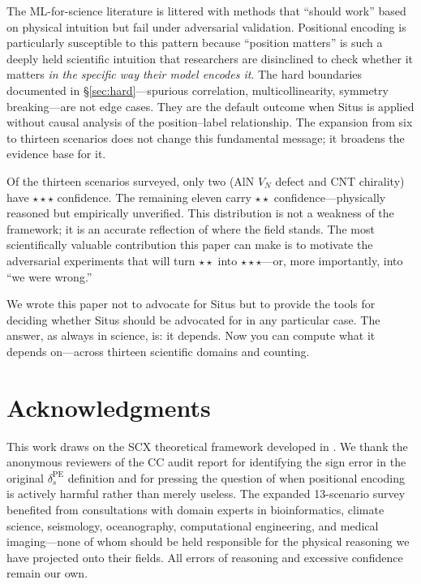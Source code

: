 \documentclass[12pt,a4paper]{article}
\begin{document}
The ML-for-science literature\cite{northcutt2021,ghorbani2019} is littered with methods that ``should work'' based on physical intuition but fail under adversarial validation. Positional encoding is particularly susceptible to this pattern because ``position matters'' is such a deeply held scientific intuition that researchers are disinclined to check whether it matters \emph{in the specific way their model encodes it}. The hard boundaries documented in \S\ref{sec:hard}---spurious correlation, multicollinearity, symmetry breaking---are not edge cases. They are the default outcome when Situs is applied without causal analysis of the position--label relationship. The expansion from six to thirteen scenarios does not change this fundamental message; it broadens the evidence base for it.

Of the thirteen scenarios surveyed, only two (AlN $V_N$ defect and CNT chirality) have $\star\star\star$ confidence. The remaining eleven carry $\star\star$ confidence—physically reasoned but empirically unverified. This distribution is not a weakness of the framework; it is an accurate reflection of where the field stands. The most scientifically valuable contribution this paper can make is to motivate the adversarial experiments that will turn $\star\star$ into $\star\star\star$---or, more importantly, into ``we were wrong.''

We wrote this paper not to advocate for Situs but to provide the tools for deciding whether Situs should be advocated for in any particular case. The answer, as always in science, is: it depends. Now you can compute what it depends on---across thirteen scientific domains and counting.

\section*{Acknowledgments}

This work draws on the SCX theoretical framework developed in \cite{cc_audit,ppe_derivation,situs_validation}. We thank the anonymous reviewers of the CC audit report for identifying the sign error in the original $\delta_s^{\mathrm{PE}}$ definition and for pressing the question of when positional encoding is actively harmful rather than merely useless. The expanded 13-scenario survey benefited from consultations with domain experts in bioinformatics, climate science, seismology, oceanography, computational engineering, and medical imaging—none of whom should be held responsible for the physical reasoning we have projected onto their fields. All errors of reasoning and excessive confidence remain our own.
\end{document}
